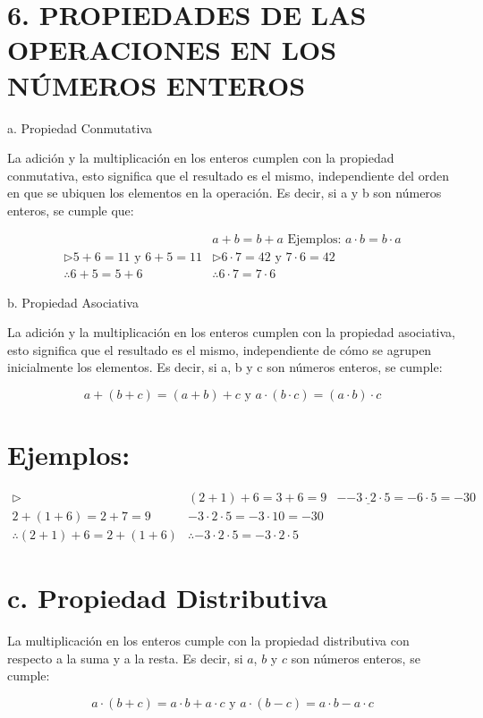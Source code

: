 \documentclass[10pt]{article}
\begin{document}
\section*{6. PROPIEDADES DE LAS OPERACIONES EN LOS NÚMEROS ENTEROS}
a. Propiedad Conmutativa

La adición y la multiplicación en los enteros cumplen con la propiedad conmutativa, esto significa que el resultado es el mismo, independiente del orden en que se ubiquen los elementos en la operación. Es decir, si a y b son números enteros, se cumple que:

$$
\begin{aligned}
& a+b=b+a \text { Ejemplos: } a \cdot b=b \cdot a \\
\triangleright 5+6=11 \text { y } 6+5=11 & \triangleright 6 \cdot 7=42 \text { y } 7 \cdot 6=42 \\
\therefore 6+5=5+6 & \therefore 6 \cdot 7=7 \cdot 6
\end{aligned}
$$

b. Propiedad Asociativa

La adición y la multiplicación en los enteros cumplen con la propiedad asociativa, esto significa que el resultado es el mismo, independiente de cómo se agrupen inicialmente los elementos. Es decir, si a, b y c son números enteros, se cumple:

$$
a+(b+c)=(a+b)+c \text { y } a \cdot(b \cdot c)=(a \cdot b) \cdot c
$$

\section*{Ejemplos:}
$$
\begin{array}{lll}
\triangleright & (2+1)+6=3+6=9 & -\underline{-3 \cdot 2 \cdot 5}=-6 \cdot 5=-30 \\
2+(1+6)=2+7=9 & -3 \cdot 2 \cdot 5=-3 \cdot 10=-30 \\
\therefore(2+1)+6=2+(1+6) & \therefore-3 \cdot 2 \cdot 5=-3 \cdot 2 \cdot 5
\end{array}
$$

\section*{c. Propiedad Distributiva}
La multiplicación en los enteros cumple con la propiedad distributiva con respecto a la suma y a la resta. Es decir, si $a$, $b$ y $c$ son números enteros, se cumple:

$$
a \cdot(b+c)=a \cdot b+a \cdot c \text { y } a \cdot(b-c)=a \cdot b-a \cdot c
$$
\end{document}
